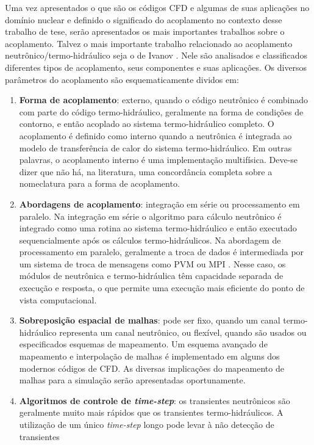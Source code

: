 Uma vez apresentados o que são os códigos CFD e algumas de suas aplicações no domínio nuclear e definido o significado do acoplamento no contexto desse trabalho de tese, serão apresentados os mais importantes 
trabalhos sobre o acoplamento. Talvez o mais importante trabalho relacionado ao acoplamento 
neutrônico/termo-hidráulico seja o de Ivanov \cite{Ivanov2007}. Nele são analisados e classificados diferentes tipos de 
acoplamento, seus componentes e suas aplicações. Os diversos parâmetros do acoplamento são esquematicamente dividos em: 
\begin{enumerate}
\item \textbf{Forma de acoplamento}: externo, quando o código neutrônico é combinado com parte do código termo-hidráulico, 
geralmente na forma de condições de contorno, e então acoplado ao sistema termo-hidráulico completo. O acoplamento 
é definido como interno quando a neutrônica é integrada ao modelo de transferência de calor do sistema termo-hidráulico. 
Em outras palavras, o acoplamento interno é uma implementação multifísica. Deve-se dizer que não há, na literatura, uma
concordância completa sobre a nomeclatura para a forma de acoplamento. 
\item \textbf{Abordagens de acoplamento}: integração em série ou processamento em paralelo. Na integração em série o algoritmo 
para cálculo neutrônico é integrado como uma rotina ao sistema termo-hidráulico e então executado sequencialmente 
após os cálculos termo-hidráulicos. Na abordagem de processamento em paralelo, geralmente a troca de dados é 
intermediada por um sistema de troca de mensagens como PVM \cite{Geist94} ou MPI \cite{Quinn2004}. Nesse caso, os 
módulos de neutrônica e termo-hidráulica têm capacidade separada de execução e resposta, o que permite uma execução 
mais eficiente do ponto de vista computacional.
\item \textbf{Sobreposição espacial de malhas}: pode ser fixo, quando um canal termo-hidráulico representa um canal neutrônico, 
ou flexível, quando são usados ou especificados esquemas de mapeamento. Um esquema avançado de mapeamento 
e interpolação de malhas \cite{Beaudoin2008} é implementado em alguns dos modernos códigos de CFD. As diversas implicações 
do mapeamento de malhas para a simulação serão apresentadas oportunamente.
\item \textbf{Algoritmos de controle de \textit{time-step}}: os transientes neutrônicos são geralmente muito mais rápidos que 
os transientes termo-hidráulicos. A utilização de um único \textit{time-step} longo pode levar à não detecção de transientes 

\end{enumerate}
